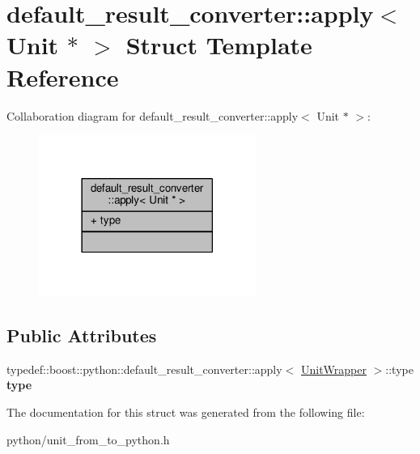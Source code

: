 \hypertarget{structdefault__result__converter_1_1apply_3_01Unit_01_5_01_4}{}\section{default\+\_\+result\+\_\+converter\+:\+:apply$<$ Unit $\ast$ $>$ Struct Template Reference}
\label{structdefault__result__converter_1_1apply_3_01Unit_01_5_01_4}


Collaboration diagram for default\+\_\+result\+\_\+converter\+:\+:apply$<$ Unit $\ast$ $>$\+:
\nopagebreak
\begin{figure}[H]
\begin{center}
\leavevmode
\includegraphics[width=201pt]{d2/d2d/structdefault__result__converter_1_1apply_3_01Unit_01_5_01_4__coll__graph}
\end{center}
\end{figure}
\subsection*{Public Attributes}
\begin{DoxyCompactItemize}
\item 
typedef\+::boost\+::python\+::default\+\_\+result\+\_\+converter\+::apply$<$ \hyperlink{classUnitWrapper}{Unit\+Wrapper} $>$\+::type {\bfseries type}\hypertarget{structdefault__result__converter_1_1apply_3_01Unit_01_5_01_4_a2f1608b1f4b36f4c8e973abe7f43fa35}{}\label{structdefault__result__converter_1_1apply_3_01Unit_01_5_01_4_a2f1608b1f4b36f4c8e973abe7f43fa35}

\end{DoxyCompactItemize}


The documentation for this struct was generated from the following file\+:\begin{DoxyCompactItemize}
\item 
python/unit\+\_\+from\+\_\+to\+\_\+python.\+h\end{DoxyCompactItemize}
